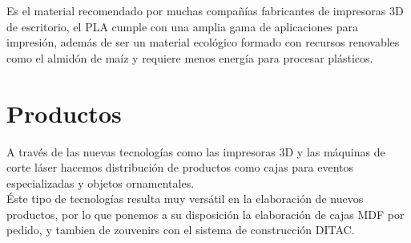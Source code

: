 \documentclass[]{article}
\begin{document}
Es el material recomendado por muchas compañías fabricantes de impresoras 3D de escritorio, el PLA cumple con una amplia gama de aplicaciones para impresión, además de ser un material ecológico formado con recursos renovables como el almidón de maíz y requiere menos energía para procesar plásticos.\\

\section{Productos}

A través de las nuevas tecnologías como las impresoras 3D y las máquinas de corte láser hacemos distribución de productos como cajas para eventos especializadas y objetos ornamentales.\\

Éste tipo de tecnologías resulta muy versátil en la elaboración de nuevos productos, por lo que ponemos a su disposición la elaboración de cajas MDF por pedido, y tambien de zouvenirs con el sistema de construcción DITAC.\\ 
\end{document}
